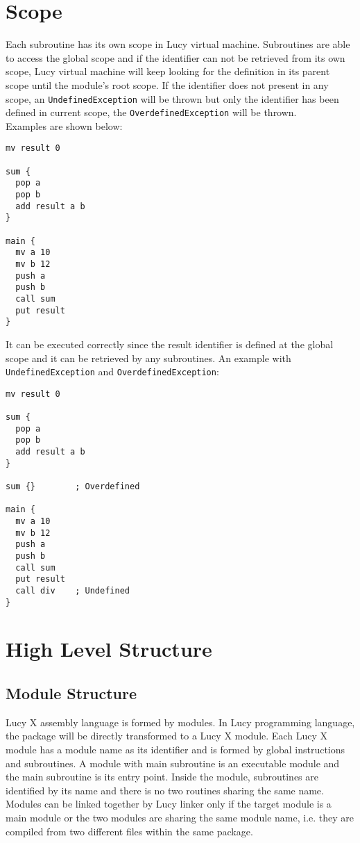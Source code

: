 \section{Scope}
Each subroutine has its own scope in Lucy virtual machine. Subroutines are able to access the global scope and if the identifier can not be retrieved from its own scope, Lucy virtual machine will keep looking for the definition in its parent scope until the module’s root scope. If the identifier does not present in any scope, an \texttt{UndefinedException} will be thrown but only the identifier has been defined in current scope, the \texttt{OverdefinedException} will be thrown. \\
Examples are shown below:
\begin{lstlisting}[language=LucyX]
mv result 0

sum {
  pop a
  pop b
  add result a b
}

main {
  mv a 10
  mv b 12
  push a
  push b
  call sum
  put result
}
\end{lstlisting}
It can be executed correctly since the result identifier is defined at the global scope and it can be retrieved by any subroutines.
An example with \texttt{UndefinedException} and \texttt{OverdefinedException}:
\begin{lstlisting}[language=LucyX]
mv result 0

sum {
  pop a
  pop b
  add result a b
}

sum {}        ; Overdefined

main {
  mv a 10
  mv b 12
  push a
  push b
  call sum
  put result
  call div    ; Undefined
}
\end{lstlisting}


\section{High Level Structure}
\subsection{Module Structure}
Lucy X assembly language is formed by modules. In Lucy programming language, the package will be directly transformed to a Lucy X module. Each Lucy X module has a module name as its identifier and is formed by global instructions and subroutines. A module with main subroutine is an executable module and the main subroutine is its entry point. Inside the module, subroutines are identified by its name and there is no two routines sharing the same name. Modules can be linked together by Lucy linker only if the target module is a main module or the two modules are sharing the same module name, i.e. they are compiled from two different files within the same package.

